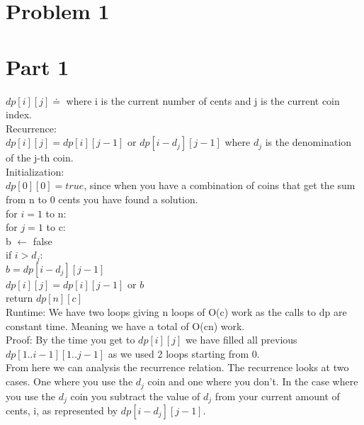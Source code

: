 \documentclass[11pt,letter]{article}
\newcommand{\2}{\{0, 1\}}
\newcommand{\1}{\mathds{1}}
\theoremstyle{definition}
\begin{document}
\section*{Problem 1}

\section*{Part 1}

$dp[i][j] \doteq$ where i is the current number of cents and j is the current coin index. \\

Recurrence: \\
$dp[i][j] = dp[i][j-1]$ or $dp[i - d_j][j-1]$ where $d_j$ is the denomination of the j-th coin.\\

Initialization:\\
$dp[0][0] = true$, since when you have a combination of coins that get the sum from n to 0 cents you have found a solution.\\

for $i = 1$ to n:\\
\hspace*{3mm} for $j=1$ to c:\\
\hspace*{6mm} b $\leftarrow$ false\\
\hspace*{6mm} if $i > d_j$: \\
\hspace*{9mm} $b = dp[i - d_j][j-1]$\\
\hspace*{6mm} $dp[i][j] = dp[i][j-1]$ or $b$\\
return $dp[n][c]$\\

Runtime: We have two loops giving n loops of O(c) work as the calls to dp are constant time. Meaning we have a total of O(cn) work.\\


Proof: By the time you get to $dp[i][j]$ we have filled all previous $dp[1..i-1][1..j-1]$ as we used 2 loops starting from 0.\\

From here we can analysis the recurrence relation. The recurrence looks at two cases. One where you use the $d_j$ coin and one where you don't. In the case where you use the $d_j$ coin you subtract the value of $d_j$ from your current amount of cents, i, as represented by $dp[i - d_j][j-1]$. \\
\end{document}
